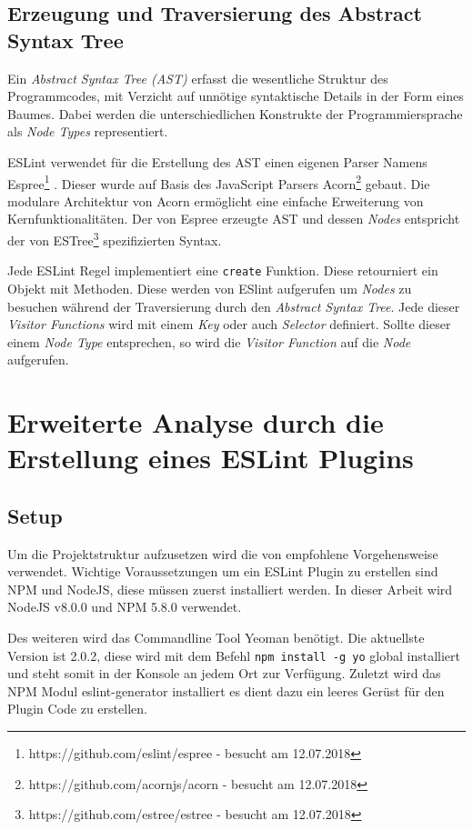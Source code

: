 \subsection{Erzeugung  und Traversierung des Abstract Syntax Tree}
\label{subsubsection:erzeugen_des_abstract_syntax_tree}
Ein \textit{Abstract Syntax Tree (AST)} erfasst die wesentliche Struktur des Programmcodes, mit Verzicht auf unnötige syntaktische Details in der Form eines Baumes. Dabei werden die unterschiedlichen Konstrukte der Programmiersprache als \textit{Node Types} representiert. \autocite{Jones2003}

ESLint verwendet für die Erstellung des AST einen eigenen Parser Namens Espree\footnote{https://github.com/eslint/espree - besucht am 12.07.2018} \autocite{ESLintEspree}. Dieser wurde auf Basis des JavaScript Parsers Acorn\footnote{https://github.com/acornjs/acorn - besucht am 12.07.2018} gebaut. Die modulare Architektur von Acorn ermöglicht eine einfache Erweiterung von Kernfunktionalitäten. Der von Espree erzeugte AST und dessen \textit{Nodes} entspricht der von ESTree\footnote{https://github.com/estree/estree - besucht am 12.07.2018} spezifizierten Syntax.

Jede ESLint Regel implementiert eine \lstinline{create} Funktion. Diese retourniert ein Objekt mit Methoden. Diese werden von ESlint aufgerufen um \textit{Nodes} zu besuchen während der Traversierung durch den \textit{Abstract Syntax Tree}. Jede dieser \textit{Visitor Functions} wird mit einem \textit{Key} oder auch \textit{Selector} definiert. Sollte dieser einem \textit{Node Type} entsprechen, so wird die \textit{Visitor Function} auf die \textit{Node} aufgerufen. \autocite{ESLintRules}

\section{Erweiterte Analyse durch die Erstellung eines ESLint Plugins}
\subsection{Setup}
Um die Projektstruktur aufzusetzen wird die von \textcite{ESLintNewRules} empfohlene Vorgehensweise verwendet. Wichtige Voraussetzungen um ein ESLint Plugin zu erstellen sind NPM und NodeJS, diese müssen zuerst installiert werden. In dieser Arbeit wird NodeJS v8.0.0 und NPM 5.8.0 verwendet.

Des weiteren wird das Commandline Tool Yeoman benötigt. Die aktuellste Version ist 2.0.2, diese wird mit dem Befehl \lstinline{npm install -g yo} global installiert und steht somit in der Konsole an jedem Ort zur Verfügung. Zuletzt wird das NPM Modul eslint-generator installiert es dient dazu ein leeres Gerüst für den Plugin Code zu erstellen.

